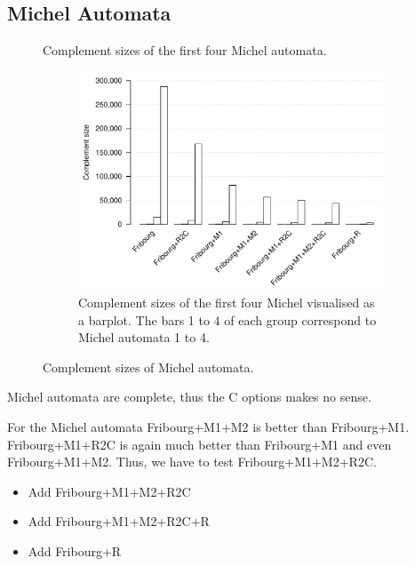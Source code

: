 \subsection{Michel Automata}

\begin{figure}[ht]
  \centering
  \begin{subtable}{0.75\textwidth}
    \centering
    
    \caption{Complement sizes of the first four Michel automata.}
  \end{subtable}

  \begin{subfigure}{0.75\textwidth}
    \centering
    \includegraphics[width=\textwidth]{figures/r/internal/michel/s.barplot.pdf}
    \caption{Complement sizes of the first four Michel visualised as a barplot. The bars 1 to 4 of each group correspond to Michel automata 1 to 4.}
  \end{subfigure}
  \caption{Complement sizes of Michel automata.}
\end{figure}

Michel automata are complete, thus the C options makes no sense.

For the Michel automata Fribourg+M1+M2 is better than Fribourg+M1. Fribourg+M1+R2C is again much better than Fribourg+M1 and even Fribourg+M1+M2. Thus, we have to test Fribourg+M1+M2+R2C. 

\begin{itemize}
\item Add Fribourg+M1+M2+R2C
\item Add Fribourg+M1+M2+R2C+R
\item Add Fribourg+R
\end{itemize}




